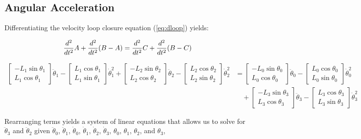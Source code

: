 \documentclass[letterpaper]{article}
\begin{document}
\subsection{Angular Acceleration}

Differentiating the velocity loop closure equation (\ref{eq:dloop}) yields:

\begin{equation}
	\frac{d^2}{dt^2} A + \frac{d^2}{dt^2} (B -A) = \frac{d^2}{dt^2} C + \frac{d^2}{dt^2} (B - C) \\
\end{equation}

\begin{align}
	\begin{bmatrix} - L_1 \sin \theta_1 \\ L_1 \cos \theta_1 \end{bmatrix} \ddot{\theta}_1 - \begin{bmatrix} L_1 \cos \theta_1 \\ L_1 \sin \theta_1 \end{bmatrix} \dot{\theta}_1^2 + \begin{bmatrix} - L_2 \sin \theta_2 \\ L_2 \cos \theta_2 \end{bmatrix} \ddot{\theta}_2 - \begin{bmatrix} L_2 \cos \theta_2 \\ L_2 \sin \theta_2 \end{bmatrix} \dot{\theta}_2^2 &= \begin{bmatrix} - L_0 \sin \theta_0 \\ L_0 \cos \theta_0 \end{bmatrix} \ddot{\theta}_0 - \begin{bmatrix} L_0 \cos \theta_0 \\ L_0 \sin \theta_0 \end{bmatrix} \dot{\theta}_0^2 \\
		& \quad + \begin{bmatrix} - L_3 \sin \theta_3 \\ L_3 \cos \theta_3 \end{bmatrix} \ddot{\theta}_3 - \begin{bmatrix} L_3 \cos \theta_3 \\ L_3 \sin \theta_3 \end{bmatrix} \dot{\theta}_3^2
\end{align}

\noindent Rearranging terms yields a system of linear equations that allows us to solve for $\ddot{\theta}_3$ and $\ddot{\theta}_2$ given $\ddot{\theta}_0$, $\ddot{\theta}_1$, $\dot{\theta}_0$, $\dot{\theta}_1$, $\dot{\theta}_2$, $\dot{\theta}_3$, $\theta_0$, $\theta_1$, $\theta_2$, and $\theta_3$,
\end{document}
